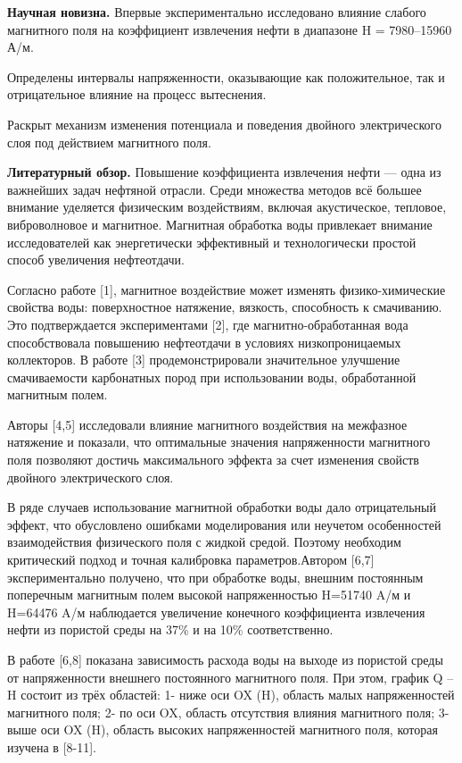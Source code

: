 \begin{multicols}{2}
{\bfseries Научная новизна.} Впервые экспериментально исследовано влияние
слабого магнитного поля на коэффициент извлечения нефти в диапазоне H =
7980--15960 А/м.

Определены интервалы напряженности, оказывающие как положительное, так и
отрицательное влияние на процесс вытеснения.

Раскрыт механизм изменения потенциала и поведения двойного
электрического слоя под действием магнитного поля.

{\bfseries Литературный обзор.} Повышение коэффициента извлечения нефти ---
одна из важнейших задач нефтяной отрасли. Среди множества методов всё
большее внимание уделяется физическим воздействиям, включая
акустическое, тепловое, виброволновое и магнитное. Магнитная обработка
воды привлекает внимание исследователей как энергетически эффективный и
технологически простой способ увеличения нефтеотдачи.

Согласно работе {[}1{]}, магнитное воздействие может изменять
физико-химические свойства воды: поверхностное натяжение, вязкость,
способность к смачиванию. Это подтверждается экспериментами {[}2{]}, где
магнитно-обработанная вода способствовала повышению нефтеотдачи в
условиях низкопроницаемых коллекторов. В работе {[}3{]}
продемонстрировали значительное улучшение смачиваемости карбонатных
пород при использовании воды, обработанной магнитным полем.

Авторы {[}4,5{]} исследовали влияние магнитного воздействия на межфазное
натяжение и показали, что оптимальные значения напряженности магнитного
поля позволяют достичь максимального эффекта за счет изменения свойств
двойного электрического слоя.

В ряде случаев использование магнитной обработки воды дало отрицательный
эффект, что обусловлено ошибками моделирования или неучетом особенностей
взаимодействия физического поля с жидкой средой. Поэтому необходим
критический подход и точная калибровка параметров.Автором {[}6,7{]}
экспериментально получено, что при обработке воды, внешним постоянным
поперечным магнитным полем высокой напряженностью H=51740 A/м и H=64476
A/м наблюдается увеличение конечного коэффициента извлечения нефти из
пористой среды на 37\% и на 10\% соответственно.

В работе {[}6,8{]} показана зависимость расхода воды на выходе из
пористой среды от напряженности внешнего постоянного магнитного поля.
При этом, график Q -- H состоит из трёх областей: 1- ниже оси OX (H),
область малых напряженностей магнитного поля; 2- по оси OX, область
отсутствия влияния магнитного поля; 3- выше оси OX (H), область высоких
напряженностей магнитного поля, которая изучена в {[}8-11{]}.


\end{multicols}
